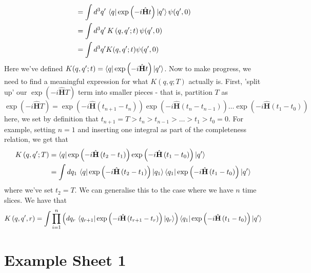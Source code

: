 \documentclass[11pt, oneside]{article}   	%
\theoremstyle{slanted}
\renewcommand{\op}[1]{\hat{\mathbf{#1}}}
\begin{document}
\begin{itemize}
\begin{align*}
									&=  \int d ^ 3 q '\,  \bra{q}\exp \left(  - i \op{H } t  \right) \ket{ q' }\psi ( q' , 0 )  \\ 							&=  \int  d ^ 3 q' \, K \left( q, q' ; t  \right)  \psi ( q' , 0 )  \\
									&=  \int d ^ 3  q ' K ( q , q ' ; t ) \psi ( q ' , 0 )  
\end{align*}  
Here we've defined $ K ( q , q '; t )  = \bra{q}\exp\left(  - i \op{H } t  \right) \ket{ q ' } $. 
Now to make progress, we need to find
a meaningful expression for what $ K \left( q, q ; T \right)  $ 
actually is. First, 'split up' 
our $ \exp (  - i \op{H } T)$ term into smaller pieces - 
that is, partition $ T $ as 
\begin{equation}
	\exp\left(  - i \op{H } T  \right)  = 
	\exp \left(  - i \op{H } \left( t_{ n + 1 }  - t _ n  \right)   \right) \exp \left(  - i \op{H } \left( t_n  - t_{ n - 1 }  \right)   \right)  \dots \exp\left(  - i \op{H } \left( t _ 1  - t _ 0  \right)   \right)  
\end{equation} here, we set by definition that 
$ t_{ n + 1 }  =T  > t _ n > t _{ n - 1 } > \dots > t _ 1 > t _ 0 = 0 $. For example, setting $ n = 1$ and inserting one 
integral as part of the completeness relation, 
we get that 
\begin{align*}
	K \left( q, q' ; T  \right)  &=  
	\bra{ q }\exp\left(  - i \op{H } \left( t_2 - t_1  \right)  \right) \exp\left(  - i \op{ H } \left( t_1  - t_0   \right)   \right) \ket{q ' }  \\
	&=  \int d q_1 \,  
	\bra{ q } \exp\left(  - i \op{H } \left( t_2  - t_1  \right) \right)\ket{q_1 } \bra{q_1 } \exp\left( - i \op{H } \left( t_1  - t_0  \right)   \right)\ket{q ' } 
\end{align*}
where we've set $ t_2 = T $. We can generalise this 
to the case where we have $ n $ time slices. We 
have that 
\begin{equation}
	K\left( q, q' , r  \right)   = 
	\int \prod_{ i = 1 } ^ n \left( d q _  r \, 
	\bra{q _{ r +  1} } \exp \left(  - i \op{ H } 
\left(  t _{ r + 1 }  - t _ r  \right)  \right) \ket{q _ r }\right)\bra{q _  1}\exp\left(  - i \op{H } \left( t_1 - t_0  \right)   \right) \ket{q ' } 
\end{equation}

\pagebreak
\section*{Example Sheet 1}


\end{itemize}
\end{document}
